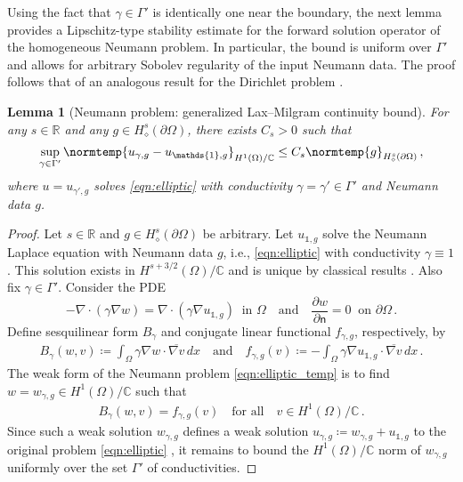 \documentclass[pdflatex,sn-mathphys-num]{sn-jnl-preprint}
\newcommand{\R}{\mathbb{R}}
\newcommand{\C}{\mathbb{C}}
\newcommand{\pOmega}{{\partial\Omega}}
\newcommand{\norm}{\normtemp}
\newcommand{\defeq}{\coloneqq} %
\newcommand{\diff}{d}
\newcommand{\dd}[1]{\,\diff{#1}}
\newcommand{\onebm}{\mathds{1}} %
\def\qfa{\quad\text{for all}\quad}
\def\qa{\quad\text{and}\quad}
\theoremstyle{thmstyleone}%
\newtheorem{lemma}[theorem]{Lemma}%
\theoremstyle{thmstyletwo}%
\theoremstyle{thmstylethree}%
\numberwithin{equation}{section}
\numberwithin{theorem}{section}
\begin{document}
\begin{appendices}
Using the fact that $\gamma\in\Gamma'$ is identically one near the boundary, the next lemma provides a Lipschitz-type stability estimate for the forward solution operator of the homogeneous Neumann problem. In particular, the bound is uniform over $\Gamma'$ and allows for arbitrary Sobolev regularity of the input Neumann data. The proof follows that of an analogous result for the Dirichlet problem \cite[Lemma~19, p.~197]{abraham2019statistical}.
\begin{lemma}[Neumann problem: generalized Lax--Milgram continuity bound]\label{lem:lax_milgram_general}
    For any $s\in\R$ and any $g\in {H}_\diamond^s(\partial\Omega)$, there exists $C_s>0$ such that
    \begin{align}\label{eqn:uniform_w_continuity_bound}
        \sup_{\gamma\in\Gamma'}\norm{u_{\gamma,g}-u_{\onebm,g}}_{H^1(\Omega)/\C}\leq C_s\norm{g}_{{H}_\diamond^s(\partial\Omega)}\,,
    \end{align}
    where $u=u_{\gamma',g}$ solves \eqref{eqn:elliptic} with conductivity $\gamma=\gamma'\in\Gamma'$ and Neumann data $g$.
\end{lemma}
\begin{proof}
    Let $s\in\R$ and $g\in {H}_\diamond^s(\partial\Omega)$ be arbitrary. Let $u_{\onebm,g}$ solve the Neumann Laplace equation with Neumann data $g$, i.e., \eqref{eqn:elliptic} with conductivity $\gamma\equiv 1$. This solution exists in $H^{s+3/2}(\Omega)/\C$ and is unique by classical results \cite[Chp.~2, Remark 7.2, pp.~188--189, taking $\Omega=\Omega$, $A=-\Delta$, $f\equiv 0$, $s=s+3/2$, $m=m_0=1$, $g_0=g$, and $N=\{z\onebm\colon z\in\C\}$]{lions2012non}.    
    Also fix $\gamma\in\Gamma'$. Consider the PDE
    \begin{equation}\label{eqn:elliptic_temp}
        -\nabla\cdot(\gamma \nabla w)=\nabla\cdot(\gamma\nabla u_{\onebm,g}) \ \text{ in } \Omega \qa \dfrac{\partial w}{\partial \mathsf{n}}=0 \ \text{ on } \pOmega\, .
    \end{equation}
    Define sesquilinear form $B_\gamma$ and conjugate linear functional $f_{\gamma,g}$, respectively, by
    \begin{align*}
        B_\gamma(w,v)\defeq \int_\Omega \gamma\nabla w\cdot\overline{\nabla v}\dd{x} \qa f_{\gamma,g}(v)\defeq -\int_\Omega \gamma\nabla u_{\onebm,g}\cdot \overline{\nabla v}\dd{x}\,.
    \end{align*}
    The weak form of the Neumann problem \eqref{eqn:elliptic_temp} is to find $w=w_{\gamma,g}\in H^1(\Omega)/\C$ such that
    \begin{align}\label{eqn:weak_neumann_temp}
        B_\gamma(w,v)=f_{\gamma,g}(v)\qfa v\in H^1(\Omega)/\C\,.
    \end{align}
    Since such a weak solution $w_{\gamma,g}$ defines a weak solution $u_{\gamma,g}\defeq w_{\gamma,g} + u_{\onebm,g}$ to the original problem \eqref{eqn:elliptic} \cite[Thm.~A.2 and its proof, pp.~392--394]{hanke2011convex}, it remains to bound the $H^1(\Omega)/\C$ norm of $w_{\gamma,g}$ uniformly over the set $\Gamma'$ of conductivities.
    

\end{proof}
\end{appendices}
\end{document}
